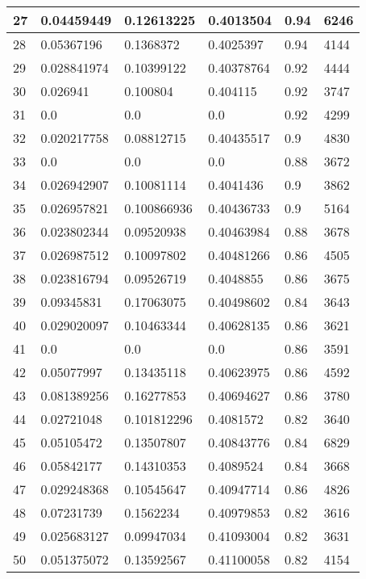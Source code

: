 \begin{longtable}{|l|l|l|l|l|l|}
27 & 0.04459449 & 0.12613225 & 0.4013504 & 0.94 & 6246 \\ \hline 
28 & 0.05367196 & 0.1368372 & 0.4025397 & 0.94 & 4144 \\ \hline 
29 & 0.028841974 & 0.10399122 & 0.40378764 & 0.92 & 4444 \\ \hline 
30 & 0.026941 & 0.100804 & 0.404115 & 0.92 & 3747 \\ \hline 
31 & 0.0 & 0.0 & 0.0 & 0.92 & 4299 \\ \hline 
32 & 0.020217758 & 0.08812715 & 0.40435517 & 0.9 & 4830 \\ \hline 
33 & 0.0 & 0.0 & 0.0 & 0.88 & 3672 \\ \hline 
34 & 0.026942907 & 0.10081114 & 0.4041436 & 0.9 & 3862 \\ \hline 
35 & 0.026957821 & 0.100866936 & 0.40436733 & 0.9 & 5164 \\ \hline 
36 & 0.023802344 & 0.09520938 & 0.40463984 & 0.88 & 3678 \\ \hline 
37 & 0.026987512 & 0.10097802 & 0.40481266 & 0.86 & 4505 \\ \hline 
38 & 0.023816794 & 0.09526719 & 0.4048855 & 0.86 & 3675 \\ \hline 
39 & 0.09345831 & 0.17063075 & 0.40498602 & 0.84 & 3643 \\ \hline 
40 & 0.029020097 & 0.10463344 & 0.40628135 & 0.86 & 3621 \\ \hline 
41 & 0.0 & 0.0 & 0.0 & 0.86 & 3591 \\ \hline 
42 & 0.05077997 & 0.13435118 & 0.40623975 & 0.86 & 4592 \\ \hline 
43 & 0.081389256 & 0.16277853 & 0.40694627 & 0.86 & 3780 \\ \hline 
44 & 0.02721048 & 0.101812296 & 0.4081572 & 0.82 & 3640 \\ \hline 
45 & 0.05105472 & 0.13507807 & 0.40843776 & 0.84 & 6829 \\ \hline 
46 & 0.05842177 & 0.14310353 & 0.4089524 & 0.84 & 3668 \\ \hline 
47 & 0.029248368 & 0.10545647 & 0.40947714 & 0.86 & 4826 \\ \hline 
48 & 0.07231739 & 0.1562234 & 0.40979853 & 0.82 & 3616 \\ \hline 
49 & 0.025683127 & 0.09947034 & 0.41093004 & 0.82 & 3631 \\ \hline 
50 & 0.051375072 & 0.13592567 & 0.41100058 & 0.82 & 4154 \\ \hline 
\end{longtable}
